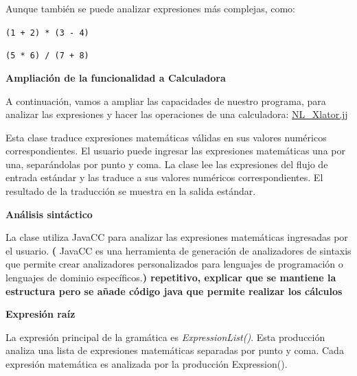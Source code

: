 Aunque también se puede analizar expresiones más complejas, como:

\begin{center}
	\lstinline|(1 + 2) * (3 - 4)|

	\lstinline|(5 * 6) / (7 + 8)|
\end{center}

\phantom{text}

\noindent \textbf{Ampliación de la funcionalidad a Calculadora}
\label{sec:ampliacioncalculadora}

\phantom{text}

\noindent A continuación, vamos a ampliar las capacidades de nuestro programa, para analizar las expresiones y hacer las operaciones de una calculadora: \hyperref[sec:nlxlator]{NL\_Xlator.jj}

%

Esta clase traduce expresiones matemáticas válidas en sus valores numéricos correspondientes. El usuario puede ingresar las expresiones matemáticas una por una, separándolas por punto y coma. La clase lee las expresiones del flujo de entrada estándar y las traduce a sus valores numéricos correspondientes. El resultado de la traducción se muestra en la salida estándar.

\phantom{text}

\noindent \textbf{Análisis sintáctico}

\phantom{text}

\noindent La clase utiliza JavaCC para analizar las expresiones matemáticas ingresadas por el usuario. \textbf{(} JavaCC es una herramienta de generación de analizadores de sintaxis que permite crear analizadores personalizados para lenguajes de programación o lenguajes de dominio específicos.\textbf{) repetitivo, explicar que se mantiene la estructura pero se añade código java que permite realizar los cálculos}

\phantom{text}

\noindent \textbf{Expresión raíz}

\phantom{text}

\lstset{inputencoding=utf8/latin1}


\noindent La expresión principal de la gramática es \textit{ExpressionList()}. Esta producción analiza una lista de expresiones matemáticas separadas por punto y coma. Cada expresión matemática es analizada por la producción Expression().

